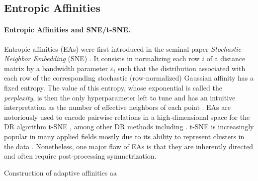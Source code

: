 \subsection{Entropic Affinities}

\paragraph{Entropic Affinities and SNE/t-SNE.}
Entropic affinities (EAs) were first introduced in the
seminal paper \emph{Stochastic Neighbor Embedding} (SNE) 
\citep{hinton2002stochastic}. It consists in normalizing each row $i$ of a distance matrix by a
bandwidth parameter $\varepsilon_i$ such that the distribution associated with each row of the corresponding stochastic (\ie row-normalized) Gaussian affinity has a fixed entropy. The value of this entropy, whose exponential is called
the \emph{perplexity}, is then the only hyperparameter left to tune and has
an intuitive interpretation as the number of effective neighbors of each point \citep{vladymyrov2013entropic}.
EAs are notoriously used to encode pairwise relations in a high-dimensional space for the DR algorithm t-SNE \citep{van2008visualizing}, among other DR methods including \citep{carreira2010elastic}. t-SNE is increasingly popular in many applied fields \citep{kobak2019art,
melit2020unsupervised} mostly due to its ability to represent clusters in the data \citep{linderman2019clustering, JMLR:v23:21-0524}. Nonetheless, one major flaw of EAs is that they are inherently directed and often require post-processing symmetrization.


\begin{prob}{Construction of adaptive affinities}
    aa
\end{prob}